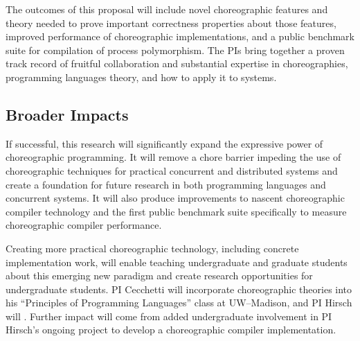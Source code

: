 The outcomes of this proposal will include novel choreographic features and theory needed to prove
important correctness properties about those features, improved performance of choreographic implementations,
and a public benchmark suite for compilation of process polymorphism.
The PIs bring together a proven track record of fruitful collaboration
and substantial expertise in choreographies, programming languages theory, and how to apply it to systems.

\subsection*{Broader Impacts}

If successful, this research will significantly expand the expressive power of choreographic programming.
It will remove a chore barrier impeding the use of choreographic techniques for practical concurrent and distributed systems
and create a foundation for future research in both programming languages and concurrent systems.
It will also produce improvements to nascent choreographic compiler technology
and the first public benchmark suite specifically to measure choreographic compiler performance.

Creating more practical choreographic technology, including concrete implementation work,
will enable teaching undergraduate and graduate students about this emerging new paradigm
and create research opportunities for undergraduate students.
PI Cecchetti will incorporate choreographic theories into his ``Principles of Programming Languages'' class at UW--Madison,
and PI Hirsch will .
Further impact will come from added undergraduate involvement in PI Hirsch's ongoing project
to develop a choreographic compiler implementation.




